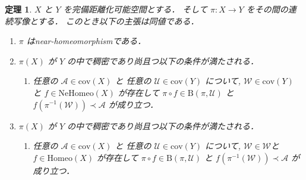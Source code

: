 \documentclass[leqno, a4paper, 12pt]{jsarticle}
\numberwithin{equation}{section}
\newtheorem{thm}{定理}
\newcommand{\yocov}[1]{\mathrm{cov}(#1)}
\newcommand{\yocovfont}[1]{\mathscr{#1}}
\newcommand{\yofine}{\prec}
\newcommand{\yonbset}[2]{\mathrm{B}(#1, #2)}
\newcommand{\yomapnhset}[1]{\mathrm{NeHomeo}(#1)}
\newcommand{\yomaphset}[1]{\mathrm{Homeo}(#1)}
\begin{document}
\begin{thm}\label{thm:main1}
$X$
と
$Y$
を完備距離化可能空間とする．
そして
$\pi \colon X\to Y$
をその間の連続写像とする．
このとき以下の主張は同値である．

\begin{enumerate}[label=\textup{(\arabic*)}]
\item\label{item:thm1:1}
$\pi$
はnear-homeomorphismである．

\item\label{item:thm1:2}
$\pi(X)$
が
$Y$
の中で稠密であり尚且つ以下の条件が満たされる．
\begin{enumerate}[label=\textup{(Bing)}, leftmargin=*]
\item\label{item:bingcondition}
任意の
$\yocovfont{A}\in \yocov{X}$
と
任意の
$\yocovfont{U}\in \yocov{Y}$
について, 
$\yocovfont{W}\in \yocov{Y}$
と
$f\in \yomapnhset{X}$
が存在して
$\pi\circ f\in \yonbset{\pi}{\yocovfont{U}}$
と
$f(\pi^{-1}(\yocovfont{W}))\yofine \yocovfont{A}$
が成り立つ．
\end{enumerate}

\item\label{item:thm1:3}
$\pi(X)$
が
$Y$
の中で稠密であり尚且つ以下の条件が満たされる．
\begin{enumerate}[label=\textup{(Bing-$*$)}, leftmargin=*]
\item\label{item:bingconditionstar}
任意の
$\yocovfont{A}\in \yocov{X}$
と
任意の
$\yocovfont{U}\in \yocov{Y}$
について, 
$\yocovfont{W}\in \yocovfont{W}$と
$f\in \yomaphset{X}$
が存在して
$\pi\circ f\in \yonbset{\pi}{\yocovfont{U}}$
と
$f(\pi^{-1}(\yocovfont{W}))\yofine \yocovfont{A}$
が成り立つ．
\end{enumerate}
\end{enumerate}
\end{thm}
\end{document}
